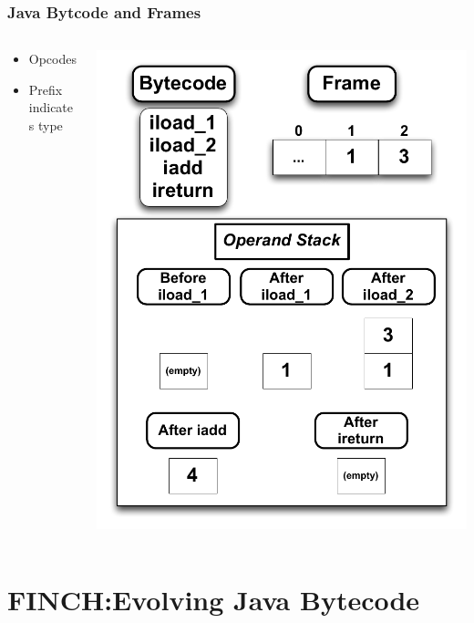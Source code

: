 \documentclass{beamer}
\begin{document}
\begin{frame}
\frametitle{Java Bytcode and Frames}
\begin{columns}
\begin{column}{0.5\textwidth}
\begin{itemize}	
\item Opcodes
\item Prefix indicates type
\end{itemize}
\end{column}

\begin{column}{0.5\textwidth}
\includegraphics[height=.8\textheight]{Illustrations/stackBytecode.pdf}
\end{column}
\end{columns}
\end{frame}


\section[FINCH]{FINCH:Evolving Java Bytecode}
\end{document}
